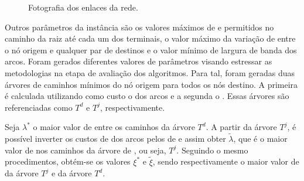 \begin{figure}[!ht]
    \centering
    \caption{Fotografia dos enlaces da rede.}
    \label{fig:instance}
\end{figure}

Outros parâmetros  da instância são os  valores máximos de {\delay}  e {\jitter}
permitidos no  caminho da  raiz até  cada um  dos terminais,  o valor  máximo da
variação de  {\delay} entre o  nó origem  e qualquer par  de destinos e  o valor
mínimo  de largura  de  banda dos  arcos. Foram  gerados  diferentes valores  de
parâmetros  visando  estressar  as  metodologias   na  etapa  de  avaliação  dos
algoritmos.  Para tal,  foram geradas  duas árvores  de caminhos  mínimos do  nó
origem para todos os nós destino. A primeira é calculada utilizando como custo o
{\delay} dos arcos e a segunda o {\jitter}. Essas árvores são referenciadas como
$T^d$ e $T^j$, respectivamente.

Seja $\lambda^{*}$ o maior valor de  {\delay} entre os caminhos da árvore $T^d$.
A partir da árvore  $T^j$, é possível inverter os custos  de {\jitter} dos arcos
pelos  de {\delay}  e assim  obter  $\tilde{\lambda}$, que  é o  maior valor  de
{\delay} nos caminhos  da árvore de {\jitter}, ou seja,  $T^j$. Seguindo o mesmo
procedimentos,   obtém-se   os   valores  $\xi^{*}$   e   $\tilde{\xi}$,   sendo
respectivamente o maior valor de {\jitter} da árvore $T^j$ e da árvore $T^d$.

